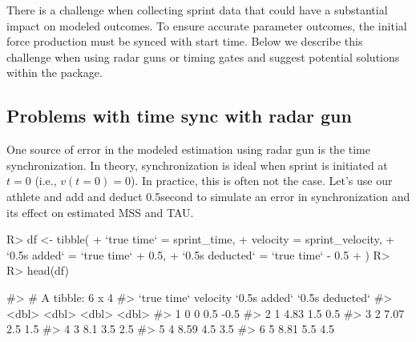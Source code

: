 \documentclass[
]{jss}
\begin{document}
There is a challenge when collecting sprint data that could have a substantial impact on modeled outcomes. To ensure accurate parameter outcomes, the initial force production must be synced with start time. Below we describe this challenge when using radar guns or timing gates and suggest potential solutions within the  package.

\hypertarget{problems-with-time-sync-with-radar-gun}{%
\subsection{Problems with time sync with radar gun}\label{problems-with-time-sync-with-radar-gun}}

One source of error in the modeled estimation using radar gun is the time synchronization. In theory, synchronization is ideal when sprint is initiated at \(t=0\) (i.e., \(v(t=0) = 0\)). In practice, this is often not the case. Let's use our athlete and add and deduct 0.5second to simulate an error in synchronization and its effect on estimated MSS and TAU.

\begin{CodeChunk}
\begin{CodeInput}
R> df <- tibble(
+   `true time` = sprint_time,
+   velocity = sprint_velocity,
+   `0.5s added` = `true time` + 0.5,
+   `0.5s deducted` = `true time` - 0.5
+ )
R> 
R> head(df)
\end{CodeInput}
\begin{CodeOutput}
#> # A tibble: 6 x 4
#>   `true time` velocity `0.5s added` `0.5s deducted`
#>         <dbl>    <dbl>        <dbl>           <dbl>
#> 1           0     0             0.5            -0.5
#> 2           1     4.83          1.5             0.5
#> 3           2     7.07          2.5             1.5
#> 4           3     8.1           3.5             2.5
#> 5           4     8.59          4.5             3.5
#> 6           5     8.81          5.5             4.5
\end{CodeOutput}
\end{CodeChunk}
\end{document}
